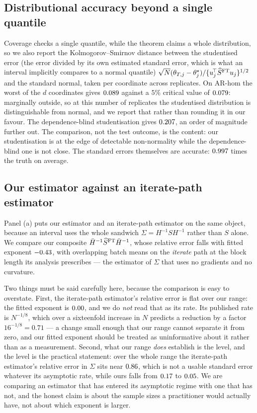 \subsection{Distributional accuracy beyond a single quantile}
\label{app:ks}

Coverage checks a single quantile, while the theorem claims a whole distribution, so we also
report the Kolmogorov--Smirnov distance between the studentised error (the error divided by
its own estimated standard error, which is what an interval implicitly compares to a normal
quantile)
$\sqrt N(\theta_{T,j}-\theta^\star_j)/\{u_j^{\!\top}\widehat{S}^{\mathrm{FT}} u_j\}^{1/2}$ and the standard normal, taken
per coordinate across replicates. On AR-hom the worst of the $d$ coordinates gives $0.089$ against a $5\%$ critical value of
$0.079$: marginally outside, so at this number of replicates the studentised distribution
is distinguishable from normal, and we report that rather than rounding it in our favour. The
dependence-blind studentisation gives $0.207$, an order of magnitude further out. The
comparison, not the test outcome, is the content: our studentisation is at the edge of detectable
non-normality while the dependence-blind one is not close. The standard errors themselves are accurate: $0.997$ times the
truth on average.

\subsection{Our estimator against an iterate-path estimator}
\label{app:obm}

Panel (a) puts our estimator and an iterate-path estimator on the same object, because an
interval uses the whole sandwich $\Sigma=H^{-1}SH^{-1}$ rather than $S$ alone. We compare our
composite $\bar{H}^{-1}\widehat{S}^{\mathrm{FT}}\bar{H}^{-1}$, whose relative error falls with fitted exponent
$-0.43$, with overlapping batch means on the \emph{iterate} path at the block length
its analysis prescribes --- the estimator of $\Sigma$ that uses no gradients and no curvature.

Two things must be said carefully here, because the comparison is easy to overstate. First, the
iterate-path estimator's relative error is flat over our range: the fitted exponent is
$0.00$, and we do \emph{not} read that as its rate. Its published rate is
$N^{-1/8}$, which over a sixteenfold increase in $N$ predicts a reduction by a factor
$16^{-1/8}=0.71$ --- a change small enough that our range cannot separate it from zero, and our
fitted exponent should be treated as uninformative about it rather than as a measurement.
Second, what our range \emph{does} establish is the level, and the level is the practical
statement: over the whole range the iterate-path estimator's relative error in $\Sigma$ sits
near $0.86$, which is not a usable standard error whatever its asymptotic rate, while
ours falls from $0.17$ to $0.05$. We are comparing an estimator that
has entered its asymptotic regime with one that has not, and the honest claim is about the
sample sizes a practitioner would actually have, not about which exponent is larger.

